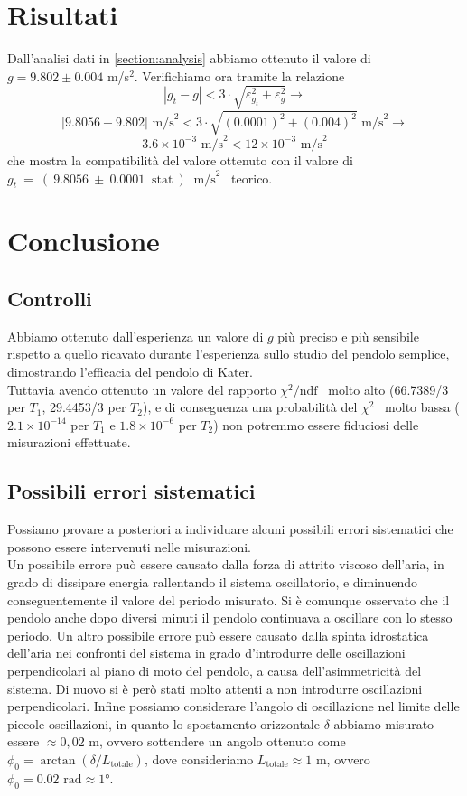 \documentclass[italian, a4paper, 10pt, twocolumn]{../../style/lab_unige}
\newcommand{\mstdErr}[1]{\varepsilon_{#1}}
\newcommand{\gLab}{$g_t~=~(~9.8056~\pm~0.0001~\text{ stat}~)~\text{ m/s}^2$}
\newcommand{\ChiSqr}{$\chi^2$\space}
\newcommand{\ChiNdf}{$\chi^2/\text{ndf}$}
\begin{document}
    

    \section{Risultati}
    \label{section:results}
    Dall'analisi dati in \autoref{section:analysis} abbiamo ottenuto il valore di $g=9.802\pm0.004$ m/s$^2$. Verifichiamo ora tramite la relazione 
    \[
        \left|g_t-g\right|<3\cdot\sqrt{\mstdErr{g_t}^2+\mstdErr{g}^2} \to
    \]
    \[
        \left|9.8056-9.802\right|\text{ m/s}^2<3\cdot\sqrt{(0.0001)^2+(0.004)^2}\text{ m/s}^2 \to
    \]
    \[
        3.6\times10^{-3}\text{ m/s}^2<12\times10^{-3}\text{ m/s}^2
    \]
    che mostra la compatibilità del valore ottenuto con il valore di \gLab~ teorico.
    
    \section{Conclusione}
    \label{section:conclusion}

    \subsection{Controlli}
    Abbiamo ottenuto dall'esperienza un valore di $g$ più preciso e più sensibile rispetto a quello ricavato durante l'esperienza sullo studio del pendolo semplice, dimostrando l'efficacia del pendolo di Kater.\\
    Tuttavia avendo ottenuto un valore del rapporto \ChiNdf~ molto alto (66.7389/3 per $T_1$, 29.4453/3 per $T_2$), e di conseguenza una probabilità del \ChiSqr~ molto bassa ($2.1\times10^{-14}$ per $T_1$ e $1.8\times10^{-6}$ per $T_2$) non potremmo essere fiduciosi delle misurazioni effettuate.

    \subsection{Possibili errori sistematici}
    Possiamo provare a posteriori a individuare alcuni possibili errori sistematici che possono essere intervenuti nelle misurazioni.\\
    Un possibile errore può essere causato dalla forza di attrito viscoso dell’aria, in grado di dissipare energia rallentando il sistema oscillatorio, e diminuendo conseguentemente il valore del periodo misurato. Si è comunque osservato che il pendolo anche dopo diversi minuti il pendolo continuava a oscillare con lo stesso periodo. 
    Un altro possibile errore può essere causato dalla spinta idrostatica dell’aria nei confronti del sistema in grado d'introdurre delle oscillazioni perpendicolari al piano di moto del pendolo, a causa dell'asimmetricità del sistema. Di nuovo si è però stati molto attenti a non introdurre oscillazioni perpendicolari. 
    Infine possiamo considerare l'angolo di oscillazione nel limite delle piccole oscillazioni, in quanto lo spostamento orizzontale $\delta$ abbiamo misurato essere $\approx 0,02$ m, ovvero sottendere un angolo ottenuto come $\phi_0=\arctan{(\delta/L_{\text{totale}})}$, dove consideriamo $L_{\text{totale}}\approx1$ m, ovvero $\phi_0=0.02\text{ rad}\approx1°$.
    \newpage
\end{document}
